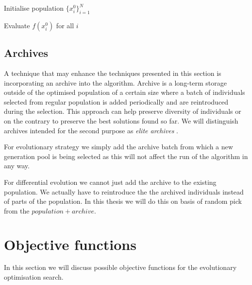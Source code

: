 \begin{algorithm}[h]
	\caption{Differential Evolution}
	\label{alg:diffEv}
	\SetAlgoNoEnd
	Initialise population $\{x_i^0\}_{i=1}^N$\;
	
	Evaluate $f(x_i^0)$ for all $i$\;
	
\end{algorithm}
\subsection{Archives}
\label{sec:archives}
A technique that may enhance the techniques presented in this section is incorporating an archive into the algorithm.
Archive is a long-term storage outside of the optimised population of a certain size where a batch of individuals selected from regular population is added periodically and are reintroduced  during the selection. This approach can help preserve diversity of individuals or on the contrary to preserve the best solutions found so far. We will distinguish archives intended for the second purpose as \textit{elite archives }.

For evolutionary strategy we simply add the archive batch from which a new generation pool is being selected as this will not affect the run of the algorithm in any way. 

For differential evolution we cannot just add the archive to the existing population. We actually have to reintroduce the the archived individuals instead of parts of the population. In this thesis we will do this on basis of random pick from the $ population + archive $.
\newpage
\section{Objective functions}
\label{sec:objFunc}
In this section we will discuss possible objective functions for the evolutionary optimisation search.

